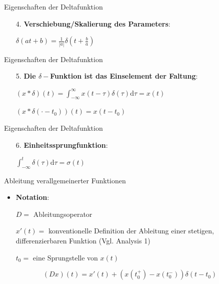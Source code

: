 \documentclass[14pt, aspectratio=169, handout]{beamer}
\begin{document}
\begin{frame}{Eigenschaften der Deltafunktion}
    \begin{itemize}
        \item[4.] \textbf{Verschiebung/Skalierung des Parameters}:
    \item[] $\delta(at + b) = \displaystyle\frac{1}{|a|}\delta\left(t + \displaystyle\frac{b}{a} \right)$
    \end{itemize}
\end{frame}

\begin{frame}{Eigenschaften der Deltafunktion}
    \begin{itemize}
        \item[5.] \textbf{Die $\delta-$Funktion ist das Einselement der Faltung}:
        \item[] $(x \ast \delta)(t) = \displaystyle\int_{-\infty}^\infty x(t-\tau)\delta(\tau)\text{d}\tau = x(t)$
        \item[] $(x \ast \delta(\cdot - t_0))(t) = x(t - t_0)$
    \end{itemize}
\end{frame}

\begin{frame}{Eigenschaften der Deltafunktion}
    \begin{itemize}
        \item[6.] \textbf{Einheitssprungfunktion}:
        \item[] $\displaystyle\int_{-\infty}^t \delta(\tau) \text{d}\tau = \sigma(t)$
    \end{itemize}
\end{frame}

\begin{frame}{Ableitung verallgemeinerter Funktionen}
    \begin{itemize}
        \item \textbf{Notation}:
        \item[] $D =$ Ableitungsoperator
        \item[] $x'(t) =$ konventionelle Definition der Ableitung einer stetigen, differenzierbaren Funktion (Vgl. Analysis 1)
        \item[]  $t_0 =$ eine Sprungstelle von $x(t)$
        \item[] 
    \end{itemize}
    $$(Dx)(t) = x'(t) + (x(t_0^+)- x(t_0^-))\delta(t-t_0)$$
\end{frame}
\end{document}
